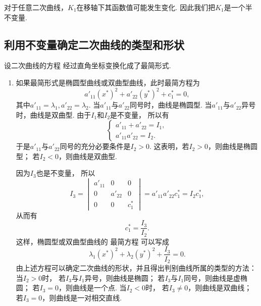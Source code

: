 \begin{remark}
对于任意二次曲线，\(K_1\)在移轴下其函数值可能发生变化.
因此我们把\(K_1\)是一个半不变量.
\end{remark}

\subsection{利用不变量确定二次曲线的类型和形状}
设二次曲线的方程 
经过直角坐标变换化成了最简形式.
\begin{enumerate}
	\item 如果最简形式是椭圆型曲线或双曲型曲线，此时最简方程为\begin{equation*}
		a'_{11} (x^*)^2 + a'_{22} (y^*)^2 + c^*_1 = 0,
	\end{equation*}
	其中\(
		a'_{11} = \lambda_1,
		a'_{22} = \lambda_2
	\).
	当\(a'_{11}\)与\(a'_{22}\)同号时，曲线是椭圆型.
	当\(a'_{11}\)与\(a'_{22}\)异号时，曲线是双曲型.
	由于\(I_1\)和\(I_2\)是不变量，
	所以有\begin{equation*}
		\left\{ \begin{array}{l}
			a'_{11} + a'_{22} = I_1, \\
			a'_{11} a'_{22} = I_2.
		\end{array} \right.
	\end{equation*}
	于是\(a'_{11}\)与\(a'_{22}\)同号的充分必要条件是\(I_2 > 0\).
	这表明，若\(I_2 > 0\)，则曲线是椭圆型；
	若\(I_2 < 0\)，则曲线是双曲型.

	因为\(I_3\)也是不变量，
	所以\begin{equation*}
		I_3
		= \begin{vmatrix}
			a'_{11} & 0 & 0 \\
			0 & a'_{22} & 0 \\
			0 & 0 & c^*_1
		\end{vmatrix}
		= a'_{11} a'_{22} c^*_1
		= I_2 c^*_1,
	\end{equation*}
	从而有\begin{equation*}
		c^*_1 = \frac{I_3}{I_2}.
	\end{equation*}
	这样，椭圆型或双曲型曲线的
	最简方程 
	可以写成\begin{equation*}
		\lambda_1 (x^*)^2 + \lambda_2 (y^*)^2 + \frac{I_3}{I_2} = 0.
	\end{equation*}
	由上述方程可以确定二次曲线的形状，并且得出判别曲线所属的类型的方法：
	当\(I_2 > 0\)时，
		若\(I_3\)与\(I_1\)异号，则曲线是椭圆；
		若\(I_3\)与\(I_1\)同号，则曲线是虚椭圆；
		若\(I_3 = 0\)，则曲线是一个点.
	当\(I_2 < 0\)时，
		若\(I_3 \neq 0\)，则曲线是双曲线；
		若\(I_3 = 0\)，则曲线是一对相交直线.


\end{enumerate}
